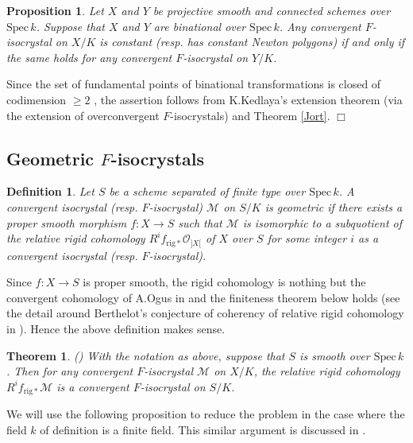 \documentclass[11pt]{amsart}
\newtheorem{theorem}[Lemma]{Theorem}
\newtheorem{proposition}[Lemma]{Proposition}
\newtheorem{definition}[Lemma]{Definition}
\begin{document}
\begin{proposition}\label{birat} 
Let $X$ and $Y$ be projective smooth and connected 
schemes over $\mathrm{Spec}\, k$. Suppose that $X$ and $Y$ 
are binational over $\mathrm{Spec}\, k$. 
Any convergent $F$-isocrystal on $X/K$ 
is constant (resp. has constant Newton polygons) if and only 
if the same holds for any convergent $F$-isocrystal on $Y/K$. 
\end{proposition}

{ {Since the set of fundamental points of binational transformations is closed of codimension $\geq 2$ 
\cite[V, Lemma 5.1]{Ha}, 
the assertion follows from K.Kedlaya's extension theorem \cite[Proposition 5.3.3]{Ke} (via 
the extension of overconvergent $F$-isocrystals) and Theorem \ref{Jort}. 
} \hspace*{\fill} $\Box$}

\subsection{Geometric $F$-isocrystals}

\begin{definition}\label{gomF} Let $S$ be a scheme separated of finite type over $\mathrm{Spec}\, k$. 
A convergent isocrystal (resp. $F$-isocrystal) $\mathcal M$ on $S/K$ is geometric 
if there exists a proper smooth morphism $f : X \rightarrow S$ 
such that $\mathcal M$ is isomorphic to a subquotient of the relative rigid cohomology 
$R^if_{\mathrm{rig} \ast}\mathcal O_{]X[}$ of $X$ over $S$ for some integer $i$ 
as a convergent isocrystal (resp. $F$-isocrystal). 
\end{definition}

Since $f : X \rightarrow S$ is proper smooth, the rigid cohomology is nothing but the convergent cohomology 
of A.Ogus in \cite{Og} and the finiteness theorem below holds 
(see the detail around Berthelot's conjecture of coherency of relative rigid cohomology in \cite{La}). 
Hence the above definition makes sense. 

\begin{theorem}\label{coh} \mbox{\rm (\cite[Sect. 3]{Og})} With the notation as above, 
suppose that $S$ is smooth over $\mathrm{Spec}\, k$. 
Then for any convergent $F$-isocrystal $\mathcal M$ on $X/K$, 
the relative rigid cohomology $R^if_{\mathrm{rig} \ast}\mathcal M$ is a convergent $F$-isocrystal on $S/K$. 
\end{theorem}

We will use the following proposition to reduce the problem in the case where 
the field $k$ of definition is a finite field. This similar argument is discussed in \cite[Section 5.4]{ES2}. 
\end{document}
